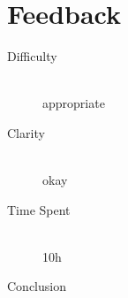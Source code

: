 \documentclass[12pt]{article}
\begin{document}
\section{Feedback}

\begin{description}
  \item[Difficulty] \hfill \\ appropriate
  \item[Clarity] \hfill \\ okay
  \item[Time Spent] \hfill \\ 10h
  \item[Conclusion] \hfill \\ 
\end{description}
\end{document}
